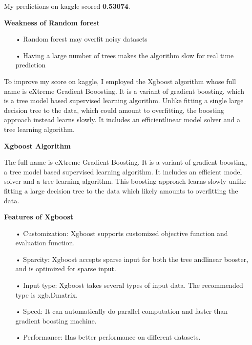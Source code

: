 My predictions on kaggle scored \textbf{0.53074}.

\textbf{Weakness of Random forest}
\begin{enumerate}
\item[•] Random forest may overfit noisy datasets

\item[•] Having a large number of trees makes the algorithm slow for real time prediction
 
\end{enumerate}

To improve my score on kaggle, I employed the Xgboost algorithm whose full name is eXtreme Gradient Booosting. It is a variant of gradient boosting, which is a tree model based supervised learning algorithm. Unlike fitting a single large decision tree to the data, which could amount to overfitting, the boosting approach instead learns slowly. It includes an efficientlinear model solver and a tree learning algorithm.


\begin{center}
\textbf{Xgboost Algorithm}
\end{center}

The full name is eXtreme Gradient Boosting. It is a variant of gradient boosting, a tree model based supervised learning algorithm. It includes an efficient model solver and a tree learning algorithm. This boosting approach learns slowly unlike fitting a large decision tree to the data which likely amounts to overfitting the data.

\textbf{Features of Xgboost}
\begin{enumerate}
\item[•] Customization: Xgboost supports customized objective function and evaluation function.

\item[•] Sparcity: Xgboost accepts sparse input for both the tree andlinear booster, and is optimized for sparse input.

\item[•] Input type: Xgboost takes several types of input data. The recommended type is xgb.Dmatrix.

\item[•] Speed: It can automatically do parallel computation and faster than gradient boosting machine.

\item[•] Performance: Has better performance on different datasets.
\end{enumerate}


